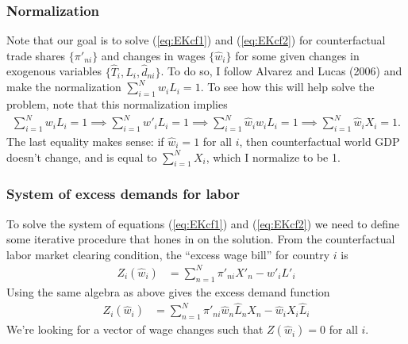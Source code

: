 \documentclass[12pt]{article}
\begin{document}
\subsubsection{Normalization}
Note that our goal is to solve (\ref{eq:EKcf1}) and (\ref{eq:EKcf2}) for counterfactual trade shares $\{\pi'_{ni}\}$ and changes in wages $\{\hat w_i\}$ for some given changes in exogenous variables $\{\hat T_i, \hat L_i, \hat d_{ni}\}$.
To do so, I follow Alvarez and Lucas (2006) and make the normalization $\sum_{i=1}^N w_iL_i = 1$. To see how this will help solve the problem, note that this normalization implies
\begin{align*}
\sum_{i=1}^N w_iL_i = 1 \implies \sum_{i=1}^N w'_iL_i = 1 \implies \sum_{i=1}^N \hat w_i w_i L_i = 1 \implies \sum_{i=1}^N \hat w_i X_i = 1.
\end{align*}
The last equality makes sense: if $\hat w_i =1$ for all $i$, then counterfactual world GDP doesn't change, and is equal to $ \sum_{i=1}^N X_i$, which I normalize to be 1.

\subsubsection{System of excess demands for labor}
To solve the system of equations (\ref{eq:EKcf1}) and (\ref{eq:EKcf2}) we need to define some iterative procedure that hones in on the solution. From the counterfactual labor market clearing condition, the ``excess wage bill'' for country $i$ is 
\begin{align*}
Z_i(\hat w_i) &= \sum_{n=1}^N \pi'_{ni}X'_n - w'_i L'_i
\end{align*}
Using the same algebra as above gives the excess demand function
\begin{align}
Z_i(\hat w_i) &= \sum_{n=1}^N \pi'_{ni} \hat w_n \hat L_n X_n - \hat w_i X_i\hat L_i  \label{eq:EKcf3}
\end{align}
We're looking for a vector of wage changes such that $Z(\hat w_i) = 0$ for all $i$.
\end{document}

